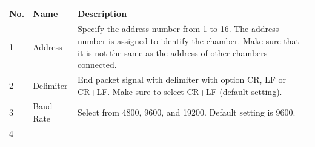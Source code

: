 \begin{longtable}[]{@{}lll@{}}
\toprule
\begin{minipage}[b]{0.04\columnwidth}\raggedright
No.\strut
\end{minipage} & \begin{minipage}[b]{0.23\columnwidth}\raggedright
Name\strut
\end{minipage} & \begin{minipage}[b]{0.65\columnwidth}\raggedright
Description\strut
\end{minipage}\tabularnewline
\midrule
\endhead
\begin{minipage}[t]{0.04\columnwidth}\raggedright
1\strut
\end{minipage} & \begin{minipage}[t]{0.23\columnwidth}\raggedright
Address\strut
\end{minipage} & \begin{minipage}[t]{0.65\columnwidth}\raggedright
Specify the address number from 1 to 16. The address number is assigned
to identify the chamber. Make sure that it is not the same as the
address of other chambers connected.\strut
\end{minipage}\tabularnewline
\begin{minipage}[t]{0.04\columnwidth}\raggedright
2\strut
\end{minipage} & \begin{minipage}[t]{0.23\columnwidth}\raggedright
Delimiter\strut
\end{minipage} & \begin{minipage}[t]{0.65\columnwidth}\raggedright
End packet signal with delimiter with option CR, LF or CR+LF. Make sure
to select CR+LF (default setting).\strut
\end{minipage}\tabularnewline
\begin{minipage}[t]{0.04\columnwidth}\raggedright
3\strut
\end{minipage} & \begin{minipage}[t]{0.23\columnwidth}\raggedright
Baud Rate\strut
\end{minipage} & \begin{minipage}[t]{0.65\columnwidth}\raggedright
Select from 4800, 9600, and 19200. Default setting is 9600.\strut
\end{minipage}\tabularnewline
\begin{minipage}[t]{0.04\columnwidth}\raggedright
4\strut
\end{minipage} & \begin{minipage}[t]{0.23\columnwidth}\raggedright

\end{minipage}
\end{longtable}
